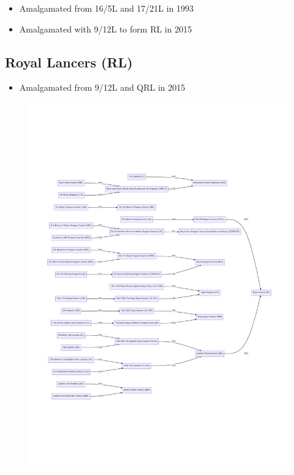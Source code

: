 \begin{itemize}
\item Amalgamated from 16/5L and 17/21L in 1993
\item Amalgamated with 9/12L to form RL in 2015
\end{itemize}

\subsection*{Royal Lancers (RL)}

\begin{itemize}
\item Amalgamated from 9/12L and QRL in 2015
\end{itemize}

\begin{figure}[h]
  \centering
  \includegraphics[width=1\textwidth]{reference/regiments.pdf}
\end{figure}
